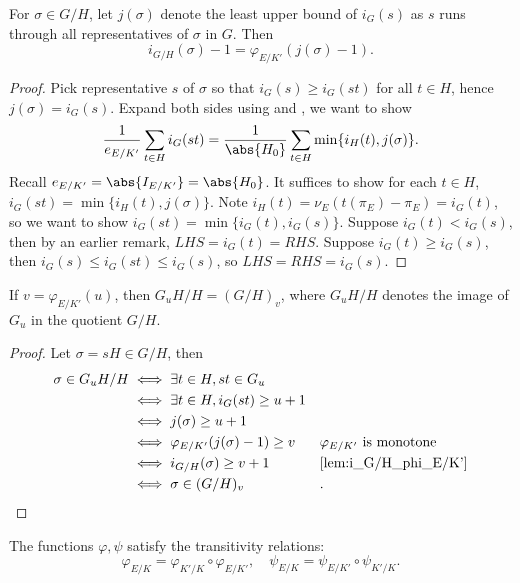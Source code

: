 \documentclass[11pt]{amsart}
\begin{document}
\begin{lem}
    \label{lem:i_G/H_phi_E/K'}
    For $\sigma \in G/H$, let $j(\sigma)$ denote the least upper bound of
    $i_G(s)$ as $s$ runs through all representatives of $\sigma$ in $G$. Then
    \[
        i_{G/H}(\sigma) - 1 = \varphi_{E/K'}(j(\sigma) - 1).
    \]
\end{lem}

\begin{proof}
    Pick representative $s$ of $\sigma$ so that $i_G(s) \geq i_G(st)$ for all $t
    \in H$, hence $j(\sigma) = i_G(s)$.  Expand both sides using
     and , we want to show
    \[
        \frac{1}{e_{E/K'}} \sum_{t \in H} i_G(st)
        = \frac{1}{\abs{H_0}} \sum_{t \in H} \min \{ i_H(t), j(\sigma) \}.
    \]
    Recall $e_{E/K'} = \abs{I_{E/K'}} = \abs{H_0}$.  It suffices to show for
    each $t \in H$, $i_G(st) = \min\{i_H(t), j(\sigma)\}$.  Note $i_H(t) =
    \nu_E(t(\pi_E) - \pi_E) = i_G(t)$, so we want to show $i_G(st) = \min
    \{i_G(t), i_G(s)\}$.  Suppose $i_G(t) < i_G(s)$, then by an earlier remark,
    $LHS = i_G(t) = RHS$.  Suppose $i_G(t) \geq i_G(s)$, then $i_G(s) \leq
    i_G(st) \leq i_G(s)$, so $LHS = RHS = i_G(s)$.
\end{proof}

\begin{thm}
    \label{thm:herbrand}
    If $v = \varphi_{E/K'}(u)$, then $G_u H / H = (G/H)_v$, where $G_u H / H$
    denotes the image of $G_u$ in the quotient $G/H$.
\end{thm}

\begin{proof}
    Let $\sigma = sH \in G/H$, then
    \begin{align*}
        \sigma \in G_u H / H
        & \iff \exists t \in H, st \in G_u &&\\
        & \iff \exists t \in H, i_G(st) \geq u + 1 &&\\
        & \iff j(\sigma) \geq u + 1 &&\\
        & \iff \varphi_{E/K'}(j(\sigma) - 1) \geq v && \varphi_{E/K'} \text{ is
        monotone}\\
        & \iff i_{G/H}(\sigma) \geq v + 1 && \text{\Cref{lem:i_G/H_phi_E/K'}}\\
        & \iff \sigma \in (G/H)_{v} &&.
    \end{align*}
\end{proof}

\begin{cor}
    The functions $\varphi, \psi$ satisfy the transitivity relations:
    \[
        \varphi_{E/K} = \varphi_{K'/K} \circ \varphi_{E/K'}, \quad
        \psi_{E/K} = \psi_{E/K'} \circ \psi_{K'/K}.
    \]
\end{cor}
\end{document}

